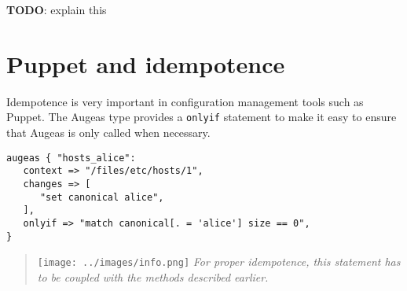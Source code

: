 \textbf{TODO}: explain this

\section{Puppet and idempotence}

Idempotence is very important in configuration management tools such as Puppet. The Augeas type provides a \verb!onlyif! statement to make it easy to ensure that Augeas is only called when necessary.

\begin{verbatim}
augeas { "hosts_alice":
   context => "/files/etc/hosts/1",
   changes => [
      "set canonical alice",
   ],
   onlyif => "match canonical[. = 'alice'] size == 0",
}
\end{verbatim}

\begin{quote}
\texttt{[image: ../images/info.png]} \emph{For proper idempotence, this statement has to be coupled with the methods described earlier.}
\end{quote}

